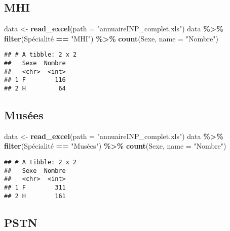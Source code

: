 \documentclass[
]{article}
\newenvironment{Shaded}{\begin{snugshade}}{\end{snugshade}}
\newcommand{\DataTypeTok}[1]{\textcolor[rgb]{0.13,0.29,0.53}{#1}}
\newcommand{\KeywordTok}[1]{\textcolor[rgb]{0.13,0.29,0.53}{\textbf{#1}}}
\newcommand{\NormalTok}[1]{#1}
\newcommand{\OperatorTok}[1]{\textcolor[rgb]{0.81,0.36,0.00}{\textbf{#1}}}
\newcommand{\StringTok}[1]{\textcolor[rgb]{0.31,0.60,0.02}{#1}}
\begin{document}
\hypertarget{mhi}{%
\subsection{MHI}\label{mhi}}

\begin{Shaded}
\begin{Highlighting}[]
\NormalTok{data \textless{}{-}}\StringTok{ }\KeywordTok{read\_excel}\NormalTok{(}\DataTypeTok{path =} \StringTok{"annuaireINP\_complet.xls"}\NormalTok{)}
\NormalTok{data }\OperatorTok{\%\textgreater{}\%}
\StringTok{  }\KeywordTok{filter}\NormalTok{(Spécialité }\OperatorTok{==}\StringTok{ "MHI"}\NormalTok{) }\OperatorTok{\%\textgreater{}\%}\StringTok{ }
\StringTok{  }\KeywordTok{count}\NormalTok{(Sexe, }\DataTypeTok{name =} \StringTok{"Nombre"}\NormalTok{)}
\end{Highlighting}
\end{Shaded}

\begin{verbatim}
## # A tibble: 2 x 2
##   Sexe  Nombre
##   <chr>  <int>
## 1 F        116
## 2 H         64
\end{verbatim}

\hypertarget{musuxe9es}{%
\subsection{Musées}\label{musuxe9es}}

\begin{Shaded}
\begin{Highlighting}[]
\NormalTok{data \textless{}{-}}\StringTok{ }\KeywordTok{read\_excel}\NormalTok{(}\DataTypeTok{path =} \StringTok{"annuaireINP\_complet.xls"}\NormalTok{)}
\NormalTok{data }\OperatorTok{\%\textgreater{}\%}
\StringTok{  }\KeywordTok{filter}\NormalTok{(Spécialité }\OperatorTok{==}\StringTok{ "Musées"}\NormalTok{) }\OperatorTok{\%\textgreater{}\%}\StringTok{ }
\StringTok{  }\KeywordTok{count}\NormalTok{(Sexe, }\DataTypeTok{name =} \StringTok{"Nombre"}\NormalTok{)}
\end{Highlighting}
\end{Shaded}

\begin{verbatim}
## # A tibble: 2 x 2
##   Sexe  Nombre
##   <chr>  <int>
## 1 F        311
## 2 H        161
\end{verbatim}

\hypertarget{pstn}{%
\subsection{PSTN}\label{pstn}}
\end{document}
